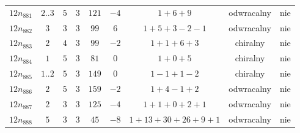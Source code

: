 \begin{longtable}{ccccccccc}
$12n_{881}$ & $2..3$ & $5$ & $3$ & $121$ & $-4$ & $1+6+9$ & odwracalny & nie \\
$12n_{882}$ & $3$ & $3$ & $3$ & $99$ & $6$ & $1+5+3-2-1$ & odwracalny & nie \\
$12n_{883}$ & $2$ & $4$ & $3$ & $99$ & $-2$ & $1+1+6+3$ & chiralny & nie \\
$12n_{884}$ & $1$ & $5$ & $3$ & $81$ & $0$ & $1+0+5$ & chiralny & nie \\
$12n_{885}$ & $1..2$ & $5$ & $3$ & $149$ & $0$ & $1-1+1-2$ & chiralny & nie \\
$12n_{886}$ & $2$ & $5$ & $3$ & $159$ & $-2$ & $1+4-1+2$ & odwracalny & nie \\
$12n_{887}$ & $2$ & $3$ & $3$ & $125$ & $-4$ & $1+1+0+2+1$ & odwracalny & nie \\
$12n_{888}$ & $5$ & $3$ & $3$ & $45$ & $-8$ & $1+13+30+26+9+1$ & odwracalny & nie \\
\hline
\end{longtable}
\normalsize

